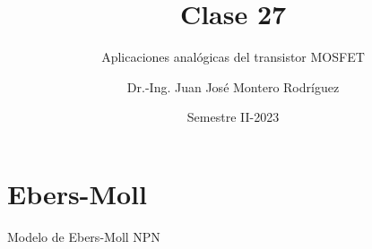 \documentclass[t,aspectratio=169]{beamer}
\title{Clase 27}
\subtitle{Aplicaciones analógicas del transistor MOSFET}
\author{Dr.-Ing. Juan José Montero Rodríguez}
\institute{Escuela de Ingeniería Electrónica}
\date{Semestre II-2023}
\begin{document}
\begin{frame}{}
\maketitle
\end{frame}

\section{Ebers-Moll}
\begin{frame}{Modelo de Ebers-Moll NPN}


\end{frame}
\end{document}
